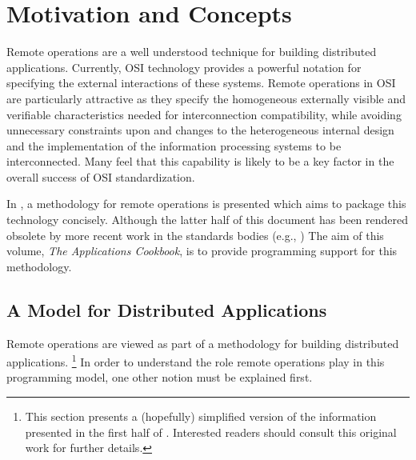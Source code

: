 
\chapter	{Motivation and Concepts}\label{cook:concepts}
Remote operations are a well understood technique for building distributed
applications.
Currently,
OSI technology provides a powerful notation for specifying the external
interactions of these systems.
Remote operations in OSI are particularly attractive as they specify the
homogeneous externally visible and verifiable characteristics needed for
interconnection compatibility,
while avoiding unnecessary constraints upon and changes to the heterogeneous
internal design and the implementation of the information processing systems
to be interconnected.
Many feel
that this capability is likely to be a key factor in the overall success of
OSI standardization.

In \cite{ECMA.ROS},
a methodology for remote operations is presented which aims to package this
technology concisely.
Although the latter half of this document has been rendered obsolete by more
recent work in the standards bodies
(e.g., \cite{ISO.ROS.Service,ISO.ROS.Protocol})
The aim of this volume, {\sl The Applications Cookbook},
is to provide programming support for this methodology.

\section	{A Model for Distributed Applications}
Remote operations are viewed as part of a methodology for building
distributed applications.%
\footnote{This section presents a (hopefully) simplified version of the
information presented in the first half of \cite{ECMA.ROS}.
Interested readers should consult this original work for further details.}
In order to understand the role remote operations play in this programming
model,
one other notion must be explained first.


